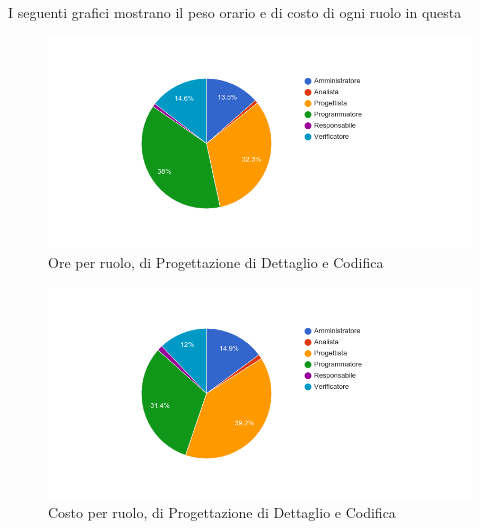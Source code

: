 I seguenti grafici mostrano il peso orario e di costo di ogni ruolo in questa 

\begin{figure}[H]
  \begin{center}
    \includegraphics[width=15cm]{res/img/prospettoEconomico/orePerRuoloProgettazioneDettaglioCodifica.png}
  \caption{Ore per ruolo,  di Progettazione di Dettaglio e Codifica}
  \end{center} 
\end{figure}  

\begin{figure}[H]
  \begin{center}
    \includegraphics[width=15cm]{res/img/prospettoEconomico/costoPerRuoloProgettazioneDettaglioCodifica.png}
  \caption{Costo per ruolo,  di Progettazione di Dettaglio e Codifica}
  \end{center} 
\end{figure}  


